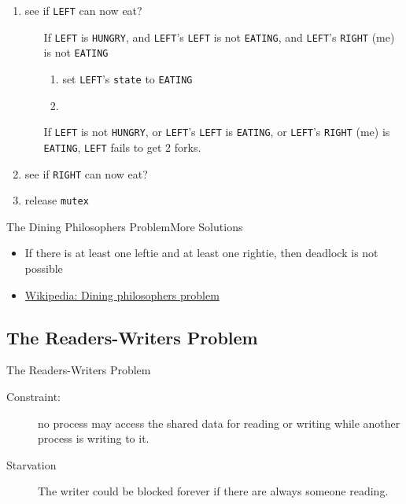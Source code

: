 \begin{enumerate}
\item {} see if \texttt{LEFT} can now eat?
  \begin{enumerate}
  \item [If] \texttt{LEFT} is \texttt{HUNGRY}, and \texttt{LEFT}'s \texttt{LEFT} is not
    \texttt{EATING}, and \texttt{LEFT}'s \texttt{RIGHT} (me) is not
    \texttt{EATING}
    \begin{enumerate}
    \item set \texttt{LEFT}'s \texttt{state} to \texttt{EATING}
    \item {} 
    \end{enumerate}
  \item [If] \texttt{LEFT} is not \texttt{HUNGRY}, or \texttt{LEFT}'s \texttt{LEFT} is
    \texttt{EATING}, or \texttt{LEFT}'s \texttt{RIGHT} (me) is \texttt{EATING}, \texttt{LEFT} fails
    to get 2 forks.
  \end{enumerate}
\item {} see if \texttt{RIGHT} can now eat?
\item release \texttt{mutex}
\end{enumerate}

\begin{frame}{The Dining Philosophers Problem}{More Solutions}
  \begin{itemize}
  \item If there is at least one leftie and at least one rightie, then
      deadlock is not possible
  \item \href{http://en.wikipedia.org/wiki/Dining_philosophers_problem}{Wikipedia: Dining
      philosophers problem}
  \end{itemize}
\end{frame}

\subsection{The Readers-Writers Problem}

\begin{frame}{The Readers-Writers Problem}
  \begin{description}
  \item[Constraint:] no process may access the shared data for reading or writing while
    another process is writing to it.
  \end{description}
  \begin{center}
  \end{center}
  \pause
  \begin{description}
  \item[Starvation] The writer could be blocked forever if there are always someone
    reading.
  \end{description}
\end{frame}

